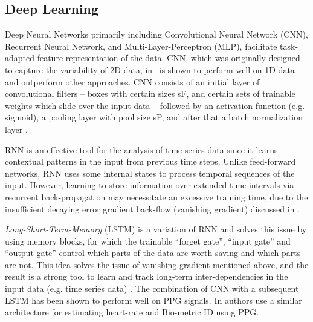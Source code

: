 \documentclass[letterpaper, 10 pt, conference]{ieeeconf}
\begin{document}
\subsection{Deep Learning}
Deep Neural Networks primarily including Convolutional Neural Network (CNN), Recurrent Neural Network, and Multi-Layer-Perceptron (MLP), facilitate task-adapted feature representation of the data. CNN, which was originally designed to capture the variability of 2D data, in~\cite{726791} is shown to perform well on 1D data and outperform other approaches. CNN consists of an initial layer of convolutional filters -- boxes with certain sizes sF, and certain sets of trainable weights which slide over the input data -- followed by an activation function (e.g. sigmoid), a pooling layer with pool size sP, and after that a batch normalization layer \cite{DBLP:journals/corr/IoffeS15}. 

RNN is an effective tool for the analysis of time-series data since it learns contextual patterns in the input from previous time steps. Unlike feed-forward networks, RNN uses some internal states to process temporal sequences of the input. However, learning to store information over extended time intervals via recurrent back-propagation may necessitate an excessive training time, due to the insufficient decaying error gradient back-flow (vanishing gradient) discussed in \cite{doi:10.1162/neco.1997.9.8.1735}.

\textit{Long-Short-Term-Memory} (LSTM) is a variation of RNN and solves this issue by using memory blocks, for which the trainable ``forget gate'', ``input gate'' and ``output gate'' control which parts of the data are worth saving and which parts are not. This idea solves the issue of vanishing gradient mentioned above, and the result is a strong tool to learn and track long-term inter-dependencies in the input data (e.g. time series data) \cite{doi:10.1162/neco.1997.9.8.1735}.
The combination of CNN with a subsequent LSTM has been shown to perform well on PPG signals. In \cite{8607019} authors use a similar architecture for estimating heart-rate and Bio-metric ID using PPG.
\end{document}
